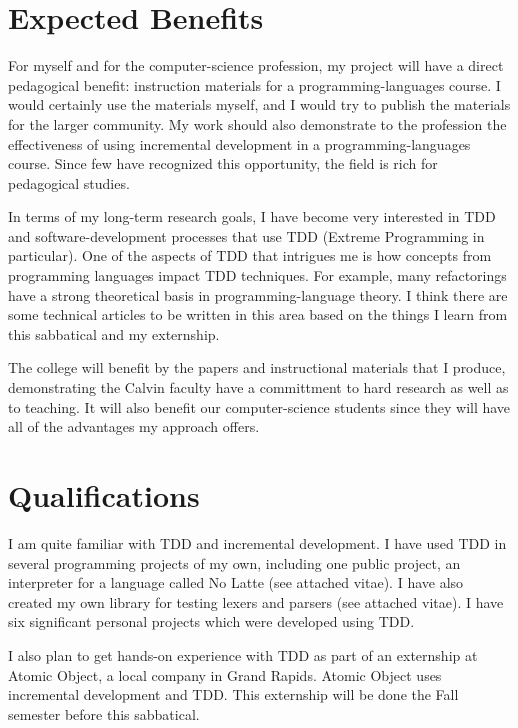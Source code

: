 \documentclass{article}
\begin{document}
\section*{Expected Benefits}


For myself and for the computer-science profession, my project will have a direct pedagogical benefit: instruction materials for a programming-languages course.  I would certainly use the materials myself, and I would try to publish the materials for the larger community.  My work should also demonstrate to the profession the effectiveness of using incremental development in a programming-languages course.  Since few have recognized this opportunity, the field is rich for pedagogical studies.

In terms of my long-term research goals, I have become very interested in TDD and software-development processes that use TDD (Extreme Programming in particular).  One of the aspects of TDD that intrigues me is how concepts from programming languages impact TDD techniques.  For example, many refactorings have a strong theoretical basis in programming-language theory.  I think there are some technical articles to be written in this area based on the things I learn from this sabbatical and my externship.

The college will benefit by the papers and instructional materials that I produce, demonstrating the Calvin faculty have a committment to hard research as well as to teaching.  It will also benefit our computer-science students since they will have all of the advantages my approach offers.

\section*{Qualifications}

I am quite familiar with TDD and incremental development.  I have used TDD in several programming projects of my own, including one public project, an interpreter for a language called No Latte (see attached vitae).  I have also created my own library for testing lexers and parsers (see attached vitae).  I have six significant personal projects which were developed using TDD.

I also plan to get hands-on experience with TDD as part of an externship at Atomic Object, a local company in Grand Rapids.  Atomic Object uses incremental development and TDD.  This externship will be done the Fall semester before this sabbatical.
\end{document}
